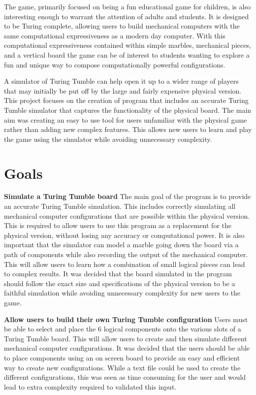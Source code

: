 \documentclass{l4proj}
\begin{document}
The game, primarily focused on being a fun educational game for children, is also interesting enough to warrant the attention of adults and students. It is designed to be Turing complete, allowing users to build mechanical computers with the same computational expressiveness as a modern day computer. With this computational expressiveness contained within simple marbles, mechanical pieces, and a vertical board the game can be of interest to students wanting to explore a fun and unique way to compose computationally powerful configurations.  

A simulator of Turing Tumble can help open it up to a wider range of players that may initially be put off by the large and fairly expensive physical version. This project focuses on the creation of program that includes an accurate Turing Tumble simulator that captures the functionality of the physical board. The main aim was creating an easy to use tool for users unfamiliar with the physical game rather than adding new complex features. This allows new users to learn and play the game using the simulator while avoiding unnecessary complexity. 


\section{Goals}
\textbf{Simulate a Turing Tumble board} The main goal of the program is to provide an accurate Turing Tumble simulation. This includes correctly simulating all mechanical computer configurations that are possible within the physical version. This is required to allow users to use this program as a replacement for the physical version, without losing any accuracy or computational power. It is also important that the simulator can model a marble going down the board via a path of components while also recording the output of the mechanical computer. This will allow users to learn how a combination of small logical pieces can lead to complex results. It was decided that the board simulated in the program should follow the exact size and specifications of the physical version to be a faithful simulation while avoiding unnecessary complexity for new users to the game.

\textbf{Allow users to build their own Turing Tumble configuration} Users must be able to select and place the 6 logical components onto the various slots of a Turing Tumble board. This will allow users to create and then simulate different mechanical computer configurations. It was decided that the users should be able to place components using an on screen board to provide an easy and efficient way to create new configurations. While a text file could be used to create the different configurations, this was seen as time consuming for the user and would lead to extra complexity required to validated this input. 
\end{document}
